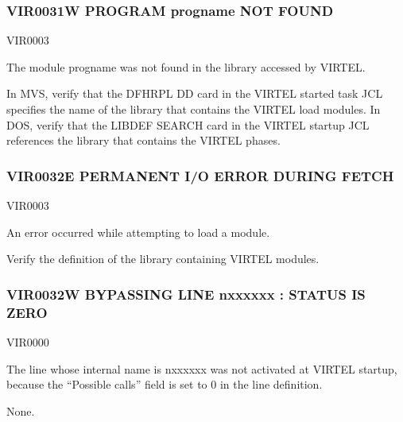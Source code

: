 \documentclass[letterpaper,10pt,english]{sphinxmanual}
\begin{document}
\subsubsection{VIR0031W PROGRAM progname NOT FOUND}
\label{\detokenize{messages:vir0031w-program-progname-not-found}}\begin{description}
\sphinxAtStartPar
VIR0003

\sphinxAtStartPar
The module progname was not found in the library accessed by VIRTEL.

\sphinxAtStartPar
In MVS, verify that the DFHRPL DD card in the VIRTEL started task JCL specifies the name of the library that contains the VIRTEL load modules. In DOS, verify that the LIBDEF SEARCH card in the VIRTEL startup JCL references the library that contains the VIRTEL phases.

\end{description}


\subsubsection{VIR0032E PERMANENT I/O ERROR DURING FETCH}
\label{\detokenize{messages:vir0032e-permanent-i-o-error-during-fetch}}\begin{description}
\sphinxAtStartPar
VIR0003

\sphinxAtStartPar
An error occurred while attempting to load a module.

\sphinxAtStartPar
Verify the definition of the library containing VIRTEL modules.

\end{description}


\subsubsection{VIR0032W BYPASSING LINE n\sphinxhyphen{}xxxxxx : STATUS IS ZERO}
\label{\detokenize{messages:vir0032w-bypassing-line-n-xxxxxx-status-is-zero}}\begin{description}
\sphinxAtStartPar
VIR0000

\sphinxAtStartPar
The line whose internal name is n\sphinxhyphen{}xxxxxx was not activated at VIRTEL startup, because the “Possible calls” field is set to 0 in the line definition.

\sphinxAtStartPar
None.

\end{description}
\end{document}
